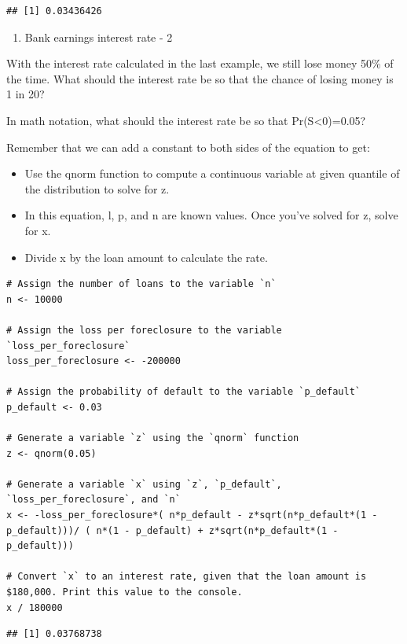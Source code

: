 \documentclass[
]{article}
\providecommand{\tightlist}{%
  \setlength{\itemsep}{0pt}\setlength{\parskip}{0pt}}
\begin{document}
\begin{verbatim}
## [1] 0.03436426
\end{verbatim}

\begin{enumerate}
\def\labelenumi{\arabic{enumi}.}
\setcounter{enumi}{5}
\tightlist
\item
  Bank earnings interest rate - 2
\end{enumerate}

With the interest rate calculated in the last example, we still lose
money 50\% of the time. What should the interest rate be so that the
chance of losing money is 1 in 20?

In math notation, what should the interest rate be so that
Pr(S\textless0)=0.05?

Remember that we can add a constant to both sides of the equation to
get:

\begin{itemize}
\tightlist
\item
  Use the qnorm function to compute a continuous variable at given
  quantile of the distribution to solve for z.
\item
  In this equation, l, p, and n are known values. Once you've solved for
  z, solve for x.
\item
  Divide x by the loan amount to calculate the rate.
\end{itemize}

\begin{verbatim}
# Assign the number of loans to the variable `n`
n <- 10000

# Assign the loss per foreclosure to the variable `loss_per_foreclosure`
loss_per_foreclosure <- -200000

# Assign the probability of default to the variable `p_default`
p_default <- 0.03

# Generate a variable `z` using the `qnorm` function
z <- qnorm(0.05)

# Generate a variable `x` using `z`, `p_default`, `loss_per_foreclosure`, and `n`
x <- -loss_per_foreclosure*( n*p_default - z*sqrt(n*p_default*(1 - p_default)))/ ( n*(1 - p_default) + z*sqrt(n*p_default*(1 - p_default)))

# Convert `x` to an interest rate, given that the loan amount is $180,000. Print this value to the console.
x / 180000
\end{verbatim}

\begin{verbatim}
## [1] 0.03768738
\end{verbatim}
\end{document}
